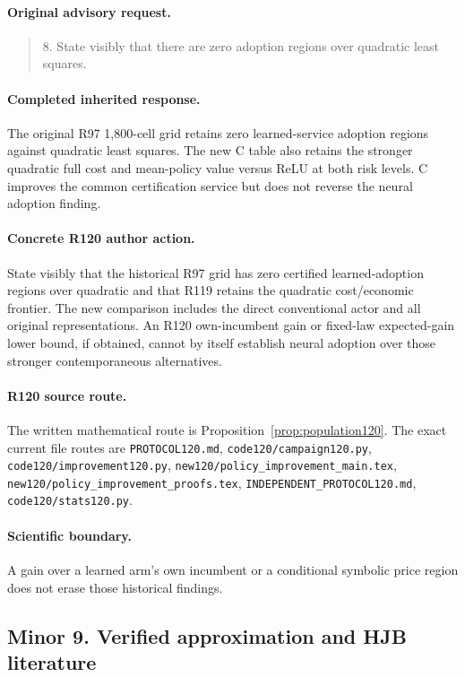 \paragraph{Original advisory request.}
\begin{quote}
8. State visibly that there are zero adoption regions over quadratic least squares.
\end{quote}
\paragraph{Completed inherited response.}
The original R97 1,800-cell grid retains zero learned-service adoption regions against quadratic least squares. The new C table also retains the stronger quadratic full cost and mean-policy value versus ReLU at both risk levels. C improves the common certification service but does not reverse the neural adoption finding.
\paragraph{Concrete R120 author action.}
State visibly that the historical R97 grid has zero certified learned-adoption regions over quadratic and that R119 retains the quadratic cost/economic frontier. The new comparison includes the direct conventional actor and all original representations. An R120 own-incumbent gain or fixed-law expected-gain lower bound, if obtained, cannot by itself establish neural adoption over those stronger contemporaneous alternatives.
\paragraph{R120 source route.}
The written mathematical route is Proposition~\ref{prop:population120}. The exact current file routes are \nolinkurl{PROTOCOL120.md}, \nolinkurl{code120/campaign120.py}, \nolinkurl{code120/improvement120.py}, \nolinkurl{new120/policy_improvement_main.tex}, \nolinkurl{new120/policy_improvement_proofs.tex}, \nolinkurl{INDEPENDENT_PROTOCOL120.md}, \nolinkurl{code120/stats120.py}.
\paragraph{Scientific boundary.}
A gain over a learned arm's own incumbent or a conditional symbolic price region does not erase those historical findings.

\subsection{Minor 9. Verified approximation and HJB literature}
\label{response120:minor-9}
